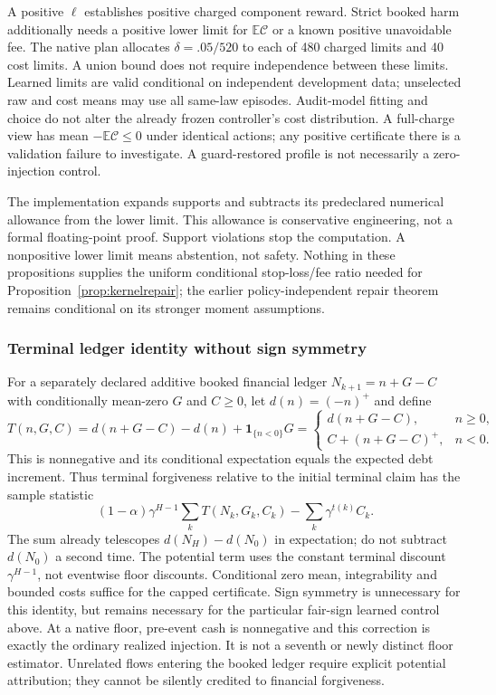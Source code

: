 A positive $\ell$ establishes positive charged component reward. Strict booked harm additionally needs a positive lower limit for $\mathbb E\mathcal C$ or a known positive unavoidable fee. The native plan allocates $\delta=.05/520$ to each of 480 charged limits and 40 cost limits. A union bound does not require independence between these limits. Learned limits are valid conditional on independent development data; unselected raw and cost means may use all same-law episodes. Audit-model fitting and choice do not alter the already frozen controller's cost distribution. A full-charge view has mean $-\mathbb E\mathcal C\le0$ under identical actions; any positive certificate there is a validation failure to investigate. A guard-restored profile is not necessarily a zero-injection control.

The implementation expands supports and subtracts its predeclared numerical allowance from the lower limit. This allowance is conservative engineering, not a formal floating-point proof. Support violations stop the computation. A nonpositive lower limit means abstention, not safety. Nothing in these propositions supplies the uniform conditional stop-loss/fee ratio needed for Proposition~\ref{prop:kernelrepair}; the earlier policy-independent repair theorem remains conditional on its stronger moment assumptions.

\subsubsection{Terminal ledger identity without sign symmetry}
For a separately declared additive booked financial ledger $N_{k+1}=n+G-C$ with conditionally mean-zero $G$ and $C\ge0$, let $d(n)=(-n)^+$ and define
\[
T(n,G,C)=d(n+G-C)-d(n)+\mathbf 1_{\{n<0\}}G
=\begin{cases}
d(n+G-C),&n\ge0,\\
C+(n+G-C)^+,&n<0.
\end{cases}
\]
This is nonnegative and its conditional expectation equals the expected debt increment. Thus terminal forgiveness relative to the initial terminal claim has the sample statistic
\[
(1-\alpha)\gamma^{H-1}\sum_k T(N_k,G_k,C_k)
-\sum_k\gamma^{t(k)}C_k.
\]
The sum already telescopes $d(N_H)-d(N_0)$ in expectation; do not subtract $d(N_0)$ a second time. The potential term uses the constant terminal discount $\gamma^{H-1}$, not eventwise floor discounts. Conditional zero mean, integrability and bounded costs suffice for the capped certificate. Sign symmetry is unnecessary for this identity, but remains necessary for the particular fair-sign learned control above. At a native floor, pre-event cash is nonnegative and this correction is exactly the ordinary realized injection. It is not a seventh or newly distinct floor estimator. Unrelated flows entering the booked ledger require explicit potential attribution; they cannot be silently credited to financial forgiveness.

